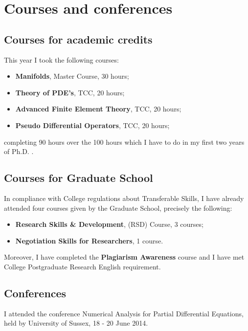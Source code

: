 \documentclass[a4paper,11pt, onecolumn]{article}
\newcommand{\gr}[1]{\textbf{#1}} %
\begin{document}
\newpage

\section{Courses and conferences}

\subsection{Courses for academic credits}

This year I took the following courses:
\begin{itemize}
\item \gr{Manifolds}, Master Course, 30 hours;
\item \gr{Theory of PDE's}, TCC, 20 hours;
\item \gr{Advanced Finite Element Theory}, TCC, 20 hours;
\item \gr{Pseudo Differential Operators}, TCC, 20 hours;
\end{itemize}
completing 90 hours over the 100 hours which I have to do in my first two years
of Ph.D. .

\subsection{Courses for Graduate School}

In compliance with College regulations about Transferable Skills, I have already
attended four courses given by the Graduate School, precisely the following:

\begin{itemize}
\item \gr{Research Skills \& Development}, (RSD) Course, 3 courses;
\item \gr{Negotiation Skills for Researchers}, 1 course.
\end{itemize}

Moreover, I have completed the \gr{Plagiarism Awareness} course and I have met
College Postgraduate Research English requirement.

\subsection{Conferences}

I attended the conference Numerical Analysis for Partial Differential Equations,
held by University of Sussex, 18 - 20 June 2014.

\newpage

\end{document}
